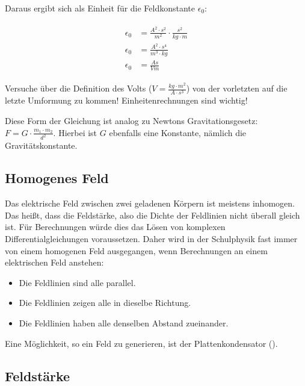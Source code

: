 \noindent Daraus ergibt sich als Einheit für die Feldkonstante $\epsilon_0$:

\begin{align}\label{eq:feldkonstante_einheiten}
\begin{split}
	\epsilon_0 &= \frac{A^{2} \cdot s^{2}}{m^{2}} \cdot \frac{s^{2}}{kg \cdot m} \\
	\epsilon_0 &= \frac{A^{2} \cdot s^{4}}{m^{3} \cdot kg} \\
	\epsilon_0 &= \frac{As}{Vm}
\end{split}
\end{align}

\begin{Aufgabe}
Versuche über die Definition des Volts ($V=\frac{kg \cdot m^2}{A \cdot s^3}$) von der vorletzten auf die letzte Umformung zu kommen! Einheitenrechnungen sind wichtig!
\end{Aufgabe}

\begin{NiceToKnow}
Diese Form der Gleichung ist analog zu Newtons Gravitationsgesetz: $F = G \cdot \frac{m_1 \cdot m_2}{d^2}$. Hierbei ist $G$ ebenfalls eine Konstante, nämlich die Gravitätskonstante.
\end{NiceToKnow}


\subsection{Homogenes Feld} \label{subsec:EFeldHomogen}

Das elektrische Feld zwischen zwei geladenen Körpern ist meistens inhomogen. Das heißt, dass die Feldstärke, also die Dichte der Feldlinien nicht überall gleich ist. Für Berechnungen würde dies das Lösen von komplexen Differentialgleichungen voraussetzen. Daher wird in der Schulphysik fast immer von einem homogenen Feld ausgegangen, wenn Berechnungen an einem elektrischen Feld anstehen:

\begin{itemize}
	\item Die Feldlinien sind alle parallel.
	\item Die Feldlinien zeigen alle in dieselbe Richtung.
	\item Die Feldlinien haben alle denselben Abstand zueinander.
\end{itemize} 

\noindent Eine Möglichkeit, so ein Feld zu generieren, ist der Plattenkondensator ().


\subsection{Feldstärke}  \label{subsec:Feldstaerke}

